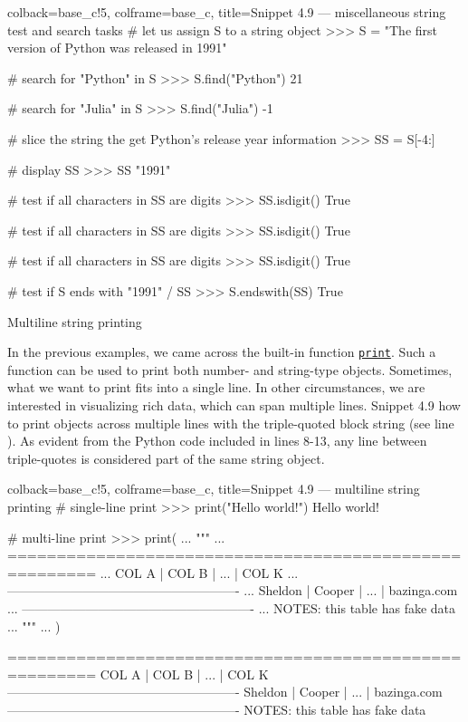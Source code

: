 \documentclass[a4paper,11pt]{book}
\numberwithin{figure}{chapter}
\numberwithin{table}{chapter}
\newcommand{\question}[1]{%
    \begin{tcolorbox}[colback=comp_c!10,colframe=comp_c,sidebyside align=top,width=\linewidth,before skip=1ex]
        #1
    \end{tcolorbox}%
    \switchcolumn%
}
\newcommand{\note}[1]{%
    \begin{tcolorbox}[colback=white!0,colframe=white!10,width=\linewidth,before skip=1ex]
        #1
    \end{tcolorbox}         
}
\begin{document}
\begin{pythoncode}[linenos=true,]{colback=base_c!5, colframe=base_c, title=\sffamily Snippet 4.9 --- miscellaneous string test and search tasks}
# let us assign S to a string object
>>> S = "The first version of Python was released in 1991"

# search for "Python" in S
>>> S.find("Python")
21

# search for "Julia" in S
>>> S.find("Julia")
-1

# slice the string the get Python's release year information
>>> SS = S[-4:]

# display SS
>>> SS
"1991"

# test if all characters in SS are digits
>>> SS.isdigit()
True

# test if all characters in SS are digits
>>> SS.isdigit()
True

# test if all characters in SS are digits
>>> SS.isdigit()
True

# test if S ends with "1991" / SS
>>> S.endswith(SS)
True
\end{pythoncode}
\clearpage

\begin{paracol}{2}
\question{\raggedright Multiline string printing}
\note{In the previous examples, we came across the built-in function \href{https://docs.python.org/3/library/functions.html#print}{\texttt{print}}. Such a function can be used to print both number- and string-type objects. Sometimes, what we want to print fits into a single line. In other circumstances, we are interested in visualizing rich data, which can span multiple lines. Snippet 4.9 how to print objects across multiple lines with the triple-quoted block string (see line ). As evident from the Python code included in lines 8-13, any line between triple-quotes is considered part of the same string object.}	
\end{paracol}

\begin{pythoncode}[linenos=true,]{colback=base_c!5, colframe=base_c, title=\sffamily Snippet 4.9 --- multiline string printing}
# single-line print
>>> print("Hello world!")
Hello world!

# multi-line print
>>> print(
... """
... =======================================================
... COL A       | COL B      | ...        | COL K
... -------------------------------------------------------
... Sheldon     | Cooper     | ...        | bazinga.com
... -------------------------------------------------------
... NOTES: this table has fake data
... """
... )

=======================================================
COL A       | COL B      | ...        | COL K
-------------------------------------------------------
Sheldon     | Cooper     | ...        | bazinga.com
-------------------------------------------------------
NOTES: this table has fake data

\end{pythoncode}
\end{document}

